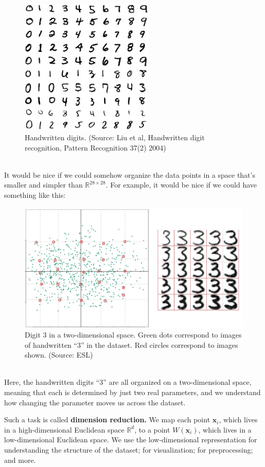 \documentclass[11pt]{article}
\newcommand{\R}{\ensuremath{\mathbb{R}}}
\newcommand{\V}[1]{\mathbf{#1}}
\begin{document}
\begin{enumerate}
\begin{figure}[H]
      \centering
      \includegraphics[width=2.5in]{digits.jpg}  
          \caption{Handwritten digits. (Source: Liu et al, Handwritten digit recognition, Pattern
          Recognition 37(2) 2004)}
    \end{figure}
~\\
It would be nice if we could somehow organize the data points in a space that's
smaller and simpler than $\R^{28\times 28}$. For example, it would be nice if we could
have something like this:
%
\begin{figure}[H]
      \centering
      \includegraphics[width=5in]{digit3_pca.jpeg}  
      \caption{Digit 3 in a two-dimensional space. Green dots correspond to
        images of handwritten ``3'' in the dataset. 
        Red circles correspond to
      images shown. (Source: ESL)}
    \end{figure}
~\\
Here,  the handwritten digits ``3'' are all organized on a two-dimensional
    space, meaning that each is determined by just two real parameters, and we
    understand how changing the parameter moves us across the dataset.

    Such a task is called {\bf dimension reduction.} We map each point
    $\V{x}_i$, which lives in a high-dimensional Euclidean space $\R^d$, to a
    point $W(\V{x}_i)$, which lives in a low-dimensional Euclidean space. 
    We use the low-dimensional representation for understanding the structure of
    the dataset; for visualization; for preprocessing; and more.





\end{enumerate}
\end{document}
